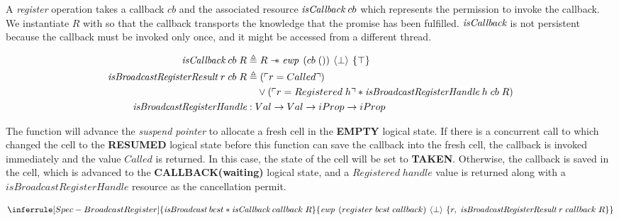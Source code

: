 A \emph{register} operation takes a callback \(cb\) and the associated resource \(\emph{isCallback}{}\; cb\) which represents the permission to invoke the callback.
We instantiate \(R\) with \gspdone{} so that the callback transports the knowledge that the promise has been fulfilled.
\(\emph{isCallback}{}\) is not persistent because the callback must be invoked only once, and it might be accessed from a different thread.

\begin{align*}
  \gsIsCb{}\; cb\; R                            & \triangleq R \wand \ewp{cb\; ()}{\bot}{\top}                                                           \\
  \emph{isBroadcastRegisterResult}\; r\; cb\; R & \triangleq (\ulcorner r = Called \urcorner)                                                            \\
                                                & \quad \vee (\ulcorner r = Registered\; h \urcorner \ast \emph{isBroadcastRegisterHandle}\; h\; cb\; R) \\
  \emph{isBroadcastRegisterHandle}              & : Val \to Val \to iProp \to iProp
\end{align*}


The  function will advance the \emph{suspend pointer} to allocate a fresh cell in the \textbf{EMPTY} logical state.
If there is a concurrent call to  which changed the cell to the \textbf{RESUMED} logical state before this function can save the callback into the fresh cell, the callback is invoked immediately and the value \(Called\) is returned.
In this case, the state of the cell will be set to \textbf{TAKEN}.
Otherwise, the callback is saved in the cell, which is advanced to the \textbf{CALLBACK(waiting)} logical state, and a \(Registered\; handle\) value is returned along with a \(\textit{isBroadcastRegisterHandle}\) resource as the cancellation permit.

\[
  \inferrule[Spec-BroadcastRegister]
  { \gsIsBcst{}\; bcst \ast \gsIsCb{}\; callback\; R }
  { \ewp{register\; bcst\; callback}{\bot}{r,\; \emph{isBroadcastRegisterResult}\; r\; callback\; R}}
\]

\subsubsection{}
\label{sec:broadcast-spec-cance}

